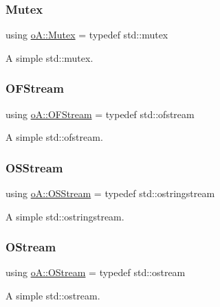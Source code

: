 \subsubsection{\texorpdfstring{Mutex}{Mutex}}
{\footnotesize\ttfamily using \mbox{\hyperlink{namespaceo_a_adc2c4dfe90e78df47ae2e677a4d0f9fa}{o\+A\+::\+Mutex}} = typedef std\+::mutex}



A simple std\+::mutex. 

\mbox{\label{namespaceo_a_a1cab4a0d38a6bab1f5d1390d7a4b5b98}} 
\subsubsection{\texorpdfstring{O\+F\+Stream}{OFStream}}
{\footnotesize\ttfamily using \mbox{\hyperlink{namespaceo_a_a1cab4a0d38a6bab1f5d1390d7a4b5b98}{o\+A\+::\+O\+F\+Stream}} = typedef std\+::ofstream}



A simple std\+::ofstream. 

\mbox{\label{namespaceo_a_a9075675ddf98c92f09ba17d3b993a72a}} 
\subsubsection{\texorpdfstring{O\+S\+Stream}{OSStream}}
{\footnotesize\ttfamily using \mbox{\hyperlink{namespaceo_a_a9075675ddf98c92f09ba17d3b993a72a}{o\+A\+::\+O\+S\+Stream}} = typedef std\+::ostringstream}



A simple std\+::ostringstream. 

\mbox{\label{namespaceo_a_ab69b2110953f22401259db9c6ddc7905}} 
\subsubsection{\texorpdfstring{O\+Stream}{OStream}}
{\footnotesize\ttfamily using \mbox{\hyperlink{namespaceo_a_ab69b2110953f22401259db9c6ddc7905}{o\+A\+::\+O\+Stream}} = typedef std\+::ostream}



A simple std\+::ostream. 

